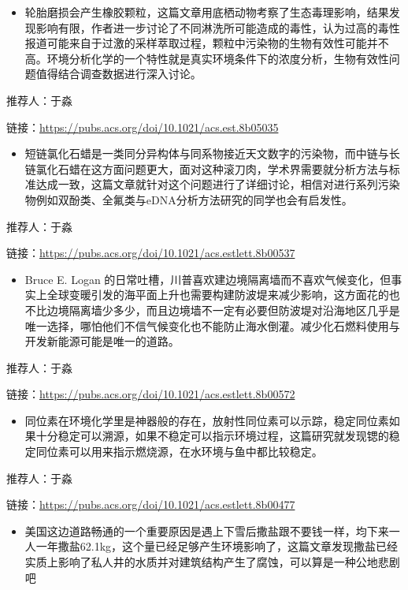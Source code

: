 \documentclass[
]{book}
\providecommand{\tightlist}{%
  \setlength{\itemsep}{0pt}\setlength{\parskip}{0pt}}
\begin{document}
\begin{itemize}
\tightlist
\item
  轮胎磨损会产生橡胶颗粒，这篇文章用底栖动物考察了生态毒理影响，结果发现影响有限，作者进一步讨论了不同淋洗所可能造成的毒性，认为过高的毒性报道可能来自于过激的采样萃取过程，颗粒中污染物的生物有效性可能并不高。环境分析化学的一个特性就是真实环境条件下的浓度分析，生物有效性问题值得结合调查数据进行深入讨论。
\end{itemize}

推荐人：于淼

链接：\url{https://pubs.acs.org/doi/10.1021/acs.est.8b05035}

\begin{itemize}
\tightlist
\item
  短链氯化石蜡是一类同分异构体与同系物接近天文数字的污染物，而中链与长链氯化石蜡在这方面问题更大，面对这种滚刀肉，学术界需要就分析方法与标准达成一致，这篇文章就针对这个问题进行了详细讨论，相信对进行系列污染物例如双酚类、全氟类与eDNA分析方法研究的同学也会有启发性。
\end{itemize}

推荐人：于淼

链接：\url{https://pubs.acs.org/doi/10.1021/acs.estlett.8b00537}

\begin{itemize}
\tightlist
\item
  Bruce E. Logan 的日常吐槽，川普喜欢建边境隔离墙而不喜欢气候变化，但事实上全球变暖引发的海平面上升也需要构建防波堤来减少影响，这方面花的也不比边境隔离墙少多少，而且边境墙不一定有必要但防波堤对沿海地区几乎是唯一选择，哪怕他们不信气候变化也不能防止海水倒灌。减少化石燃料使用与开发新能源可能是唯一的道路。
\end{itemize}

推荐人：于淼

链接：\url{https://pubs.acs.org/doi/10.1021/acs.estlett.8b00572}

\begin{itemize}
\tightlist
\item
  同位素在环境化学里是神器般的存在，放射性同位素可以示踪，稳定同位素如果十分稳定可以溯源，如果不稳定可以指示环境过程，这篇研究就发现锶的稳定同位素可以用来指示燃烧源，在水环境与鱼中都比较稳定。
\end{itemize}

推荐人：于淼

链接：\url{https://pubs.acs.org/doi/10.1021/acs.estlett.8b00477}

\begin{itemize}
\tightlist
\item
  美国这边道路畅通的一个重要原因是遇上下雪后撒盐跟不要钱一样，均下来一人一年撒盐62.1kg，这个量已经足够产生环境影响了，这篇文章发现撒盐已经实质上影响了私人井的水质并对建筑结构产生了腐蚀，可以算是一种公地悲剧吧
\end{itemize}
\end{document}
